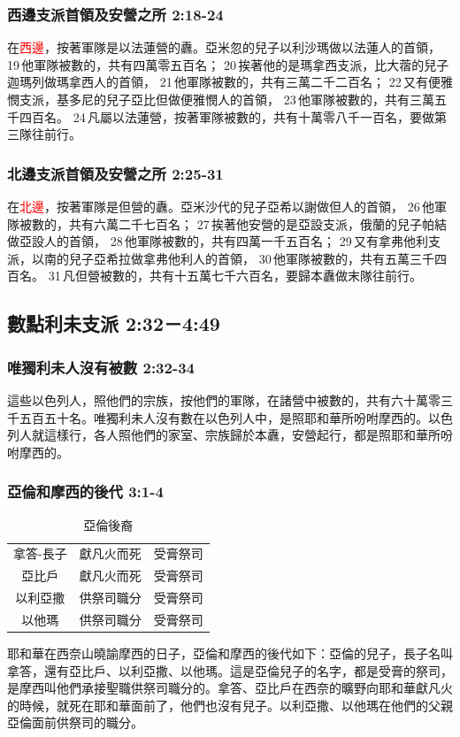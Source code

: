 \subsubsection{西邊支派首領及安營之所 2:18-24}
在\textcolor{red}{西邊}，按著軍隊是以法蓮營的纛。亞米忽的兒子以利沙瑪做以法蓮人的首領， 19 他軍隊被數的，共有四萬零五百名； 20 挨著他的是瑪拿西支派，比大蓿的兒子迦瑪列做瑪拿西人的首領， 21 他軍隊被數的，共有三萬二千二百名； 22 又有便雅憫支派，基多尼的兒子亞比但做便雅憫人的首領， 23 他軍隊被數的，共有三萬五千四百名。 24 凡屬以法蓮營，按著軍隊被數的，共有十萬零八千一百名，要做第三隊往前行。

\subsubsection{北邊支派首領及安營之所 2:25-31}
在\textcolor{red}{北邊}，按著軍隊是但營的纛。亞米沙代的兒子亞希以謝做但人的首領， 26 他軍隊被數的，共有六萬二千七百名； 27 挨著他安營的是亞設支派，俄蘭的兒子帕結做亞設人的首領， 28 他軍隊被數的，共有四萬一千五百名； 29 又有拿弗他利支派，以南的兒子亞希拉做拿弗他利人的首領， 30 他軍隊被數的，共有五萬三千四百名。 31 凡但營被數的，共有十五萬七千六百名，要歸本纛做末隊往前行。

\subsection{數點利未支派 2:32－4:49}
\subsubsection{唯獨利未人沒有被數 2:32-34}
這些以色列人，照他們的宗族，按他們的軍隊，在諸營中被數的，共有六十萬零三千五百五十名。唯獨利未人沒有數在以色列人中，是照耶和華所吩咐摩西的。以色列人就這樣行，各人照他們的家室、宗族歸於本纛，安營起行，都是照耶和華所吩咐摩西的。

\subsubsection{亞倫和摩西的後代 3:1-4}
\begin{table}
\vspace*{-5mm}
\centering
\begin{tabular}{ c|c|c }\hline\hline
拿答-長子 & 獻凡火而死&受膏祭司\\ 
亞比戶 &獻凡火而死&受膏祭司\\  
以利亞撒 &供祭司職分&受膏祭司   \\
以他瑪  & 供祭司職分&受膏祭司   \\\hline
\end{tabular}
\caption{亞倫後裔}
\end{table}
耶和華在西奈山曉諭摩西的日子，亞倫和摩西的後代如下：亞倫的兒子，長子名叫拿答，還有亞比戶、以利亞撒、以他瑪。這是亞倫兒子的名字，都是受膏的祭司，是摩西叫他們承接聖職供祭司職分的。拿答、亞比戶在西奈的曠野向耶和華獻凡火的時候，就死在耶和華面前了，他們也沒有兒子。以利亞撒、以他瑪在他們的父親亞倫面前供祭司的職分。

